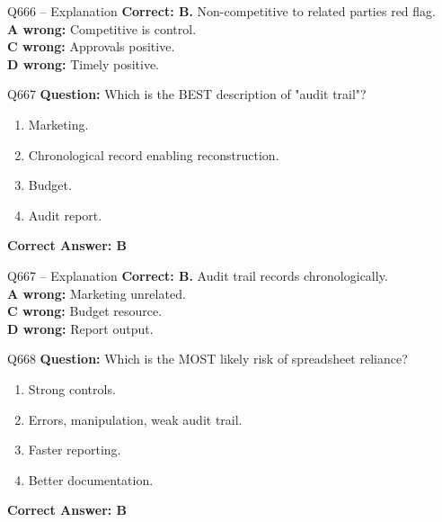 \documentclass[aspectratio=169,10pt]{beamer}
\begin{document}
	\begin{frame}[t]{Q666 -- Explanation}
		\small
		\textbf{Correct: B.} Non-competitive to related parties red flag. \\[4pt]
		\textbf{A wrong:} Competitive is control. \\[2pt]
		\textbf{C wrong:} Approvals positive. \\[2pt]
		\textbf{D wrong:} Timely positive.
	\end{frame}
	
	\begin{frame}[t]{Q667}
		\small
		\textbf{Question:} Which is the BEST description of "audit trail"?
		\begin{enumerate}[label=\Alph*.,itemsep=1pt,topsep=2pt]
			\item Marketing.
			\item Chronological record enabling reconstruction.
			\item Budget.
			\item Audit report.
		\end{enumerate}
		\vspace{4pt}
		\textbf{Correct Answer: B}
	\end{frame}
	
	\begin{frame}[t]{Q667 -- Explanation}
		\small
		\textbf{Correct: B.} Audit trail records chronologically. \\[4pt]
		\textbf{A wrong:} Marketing unrelated. \\[2pt]
		\textbf{C wrong:} Budget resource. \\[2pt]
		\textbf{D wrong:} Report output.
	\end{frame}
	
	\begin{frame}[t]{Q668}
		\small
		\textbf{Question:} Which is the MOST likely risk of spreadsheet reliance?
		\begin{enumerate}[label=\Alph*.,itemsep=1pt,topsep=2pt]
			\item Strong controls.
			\item Errors, manipulation, weak audit trail.
			\item Faster reporting.
			\item Better documentation.
		\end{enumerate}
		\vspace{4pt}
		\textbf{Correct Answer: B}
	\end{frame}
	
\end{document}
